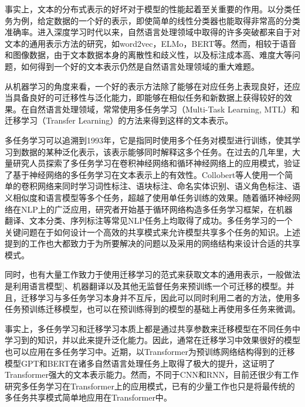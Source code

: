 事实上，文本的分布式表示的好坏对于模型的性能起着至关重要的作用。以分类任务为例，给定数据的一个好的表示，即使简单的线性分类器也能取得非常高的分类准确率\cite{tenney2018you}\cite{liu2019linguistic}。进入深度学习时代以来，自然语言处理领域中取得的许多突破都来自于对文本的通用表示方法的研究，如word2vec\cite{DBLP:conf/nips/MikolovSCCD13}，ELMo\cite{DBLP:conf/naacl/PetersNIGCLZ18}，BERT\cite{devlin2018bert}等。然而，相较于语音和图像数据，由于文本数据本身的离散性和歧义性，以及标注成本高、难度大等问题，如何得到一个好的文本表示仍然是自然语言处理领域的重大难题。

从机器学习的角度来看，一个好的表示方法除了能够在对应任务上表现良好，还应当具备良好的可迁移性与泛化能力，即能够在相似任务和新数据上获得较好的效果。在自然语言处理领域，常常使用多任务学习（Multi-Task Learning, MTL）和迁移学习（Transfer Learning）的方法来得到这样的文本表示\cite{devlin2018bert}\cite{DBLP:conf/icml/CollobertW08}。

多任务学习可以追溯到1993年\cite{DBLP:conf/icml/Caruana93}，它是指同时使用多个任务对模型进行训练，使其学习到数据的某种泛化表示，该表示能够同时解释这多个任务。在过去的几年里，大量研究人员探索了多任务学习在卷积神经网络和循环神经网络上的应用模式，验证了基于神经网络的多任务学习在文本表示上的有效性。Collobert等人\cite{DBLP:conf/icml/CollobertW08}使用一个简单的卷积网络来同时学习词性标注、语块标注、命名实体识别、语义角色标注、语义相似度和语言模型等多个任务，超越了使用单任务训练的效果。随着循环神经网络在NLP上的广泛应用，研究者开始基于循环网络构造多任务学习框架，在机器翻译\cite{DBLP:conf/acl/DongWHYW15}、文本分类\cite{DBLP:conf/ijcai/LiuQH16}\cite{DBLP:conf/acl/LiuQH17}、序列标注\cite{DBLP:conf/acl/SogaardG16}等常见NLP任务上均取得了成功。多任务学习的一个关键问题在于如何设计一个高效的共享模式来允许模型共享多个任务的知识。上述提到的工作也大都致力于为所要解决的问题以及采用的网络结构来设计合适的共享模式。

同时，也有大量工作致力于使用迁移学习的范式来获取文本的通用表示，一般做法是利用语言模型\cite{DBLP:conf/naacl/PetersNIGCLZ18}]\cite{radford2018improving}、机器翻译\cite{DBLP:conf/nips/McCannBXS17}以及其他无监督任务\cite{devlin2018bert}来预训练一个可迁移的模型。并且，迁移学习与多任务学习本身并不互斥，因此可以同时利用二者的方法，使用多任务预训练迁移模型\cite{DBLP:conf/iclr/SubramanianTBP18}，也可以在预训练得到的模型的基础上再使用多任务来微调\cite{liu2019multi}\cite{anonymous2018bam!}。

事实上，多任务学习和迁移学习本质上都是通过共享参数来迁移模型在不同任务中学习到的知识，并以此来提升泛化能力。因此，通常在迁移学习中效果很好的模型也可以应用在多任务学习中。近期，以Transformer为预训练网络结构得到的迁移模型GPT\cite{radford2018improving}和BERT\cite{devlin2018bert}在诸多自然语言处理任务上取得了极大的提升，这证明了Transformer强大的文本表示能力。然而，不同于CNN和RNN，目前还很少有工作研究多任务学习在Transformer上的应用模式，已有的少量工作也只是将最传统的多任务共享模式简单地应用在Transformer中\cite{liu2019multi}。


